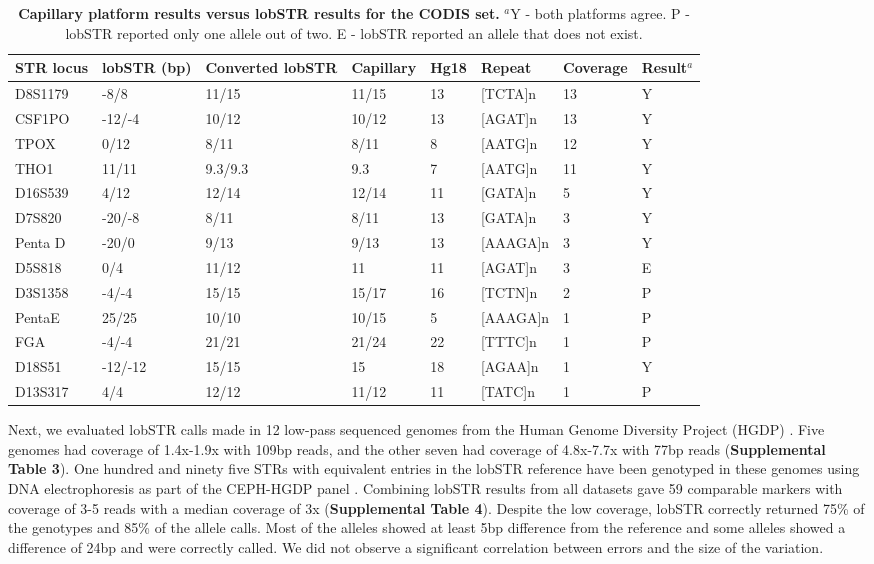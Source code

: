 \begin{table}
\centering
\label{tab:lobtab3}
\begin{adjustbox}{width=1\textwidth}
\begin{tabular}{l l l l l l l l}
\hline
STR locus & lobSTR (bp) & Converted lobSTR & Capillary & Hg18 & Repeat & Coverage & Result$^a$\\
\hline
D8S1179 & -8/8 & 11/15 & 11/15 & 13 & [TCTA]n & 13 & Y\\
CSF1PO & -12/-4 & 10/12 & 10/12 & 13 & [AGAT]n & 13 & Y\\
TPOX & 0/12 & 8/11 & 8/11 & 8 & [AATG]n & 12 & Y \\
THO1 & 11/11 & 9.3/9.3 & 9.3 & 7 & [AATG]n & 11 & Y\\
D16S539 & 4/12 & 12/14 & 12/14 & 11 & [GATA]n & 5 & Y\\
D7S820 & -20/-8 & 8/11 & 8/11 & 13 & [GATA]n & 3 & Y\\
Penta D & -20/0 & 9/13 & 9/13 & 13 & [AAAGA]n & 3 & Y\\
D5S818 & 0/4 & 11/12 & 11 & 11 & [AGAT]n & 3 & E \\
D3S1358 & -4/-4 & 15/15 & 15/17 & 16 & [TCTN]n & 2 & P\\
PentaE & 25/25 & 10/10 & 10/15 & 5 & [AAAGA]n & 1 & P \\
FGA & -4/-4 & 21/21 & 21/24 & 22 & [TTTC]n & 1 & P\\
D18S51 & -12/-12 & 15/15 & 15 & 18 & [AGAA]n & 1 & Y\\
D13S317 & 4/4 & 12/12 & 11/12 & 11 & [TATC]n & 1 & P\\
\hline
\end{tabular}
\end{adjustbox}
\caption{\textbf{Capillary platform results versus lobSTR results for the CODIS set.} $^a$Y - both platforms agree. P - lobSTR reported only one allele out of two. E - lobSTR reported an allele that does not exist.}
\end{table}

Next, we evaluated lobSTR calls made in 12 low-pass sequenced genomes from the Human Genome Diversity Project (HGDP) \cite{GreenKrauseBriggsEtAl2010,ReichGreenKircherEtAl2010}. Five genomes had coverage of 1.4x-1.9x with 109bp reads, and the other seven had coverage of 4.8x-7.7x with 77bp reads (\textbf{Supplemental Table 3}). One hundred and ninety five STRs with equivalent entries in the lobSTR reference have been genotyped in these genomes using DNA electrophoresis as part of the CEPH-HGDP panel \cite{RamachandranDeshpandeRosemanEtAl2005,PembertonSandefurJakobssonEtAl2009}. Combining lobSTR results from all datasets gave 59 comparable markers with coverage of 3-5 reads with a median coverage of 3x (\textbf{Supplemental Table 4}). Despite the low coverage, lobSTR correctly returned 75\% of the genotypes and 85\% of the allele calls. Most of the alleles showed at least 5bp difference from the reference and some alleles showed a difference of 24bp and were correctly called. We did not observe a significant correlation between errors and the size of the variation. 

